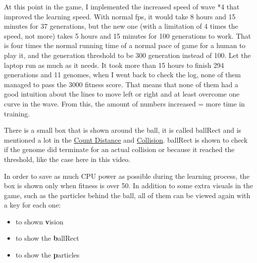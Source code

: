 At this point in the game, I implemented the increased speed of wave *4 that improved the learning speed. With normal fps, it would take 8 hours and 15 minutes for 37 generations, but the new one (with a limitation of 4 times the speed, not more) takes 5 hours and 15 minutes for 100 generations to work. That is four times the normal running time of a normal pace of game for a human to play it, and the generation threshold to be 300 generation instead of 100. Let the laptop run as much as it needs. It took more than 15 hours to finish 294 generations and 11 genomes, when I went back to check the log, none of them managed to pass the 3000 fitness score. That means that none of them had a good intuition about the lines to move left or right and at least overcome one curve in the wave. From this, the amount of numbers increased = more time in training.

There is a small box that is shown around the ball, it is called ballRect and is mentioned a lot in the \hyperref[sec:count-distance]{Count Distance} and \hyperref[sec:collision]{Collision}. ballRect is shown to check if the genome did terminate for an actual collision or because it reached the threshold, like the case here in this video.

In order to save as much CPU power as possible during the learning process, the box is shown only when fitness is over 50. In addition to some extra visuals in the game, such as the particles behind the ball, all of them can be viewed again with a key for each one:
\begin{itemize}
	\item {} to shown \textbf{v}ision
	\item {} to show the \textbf{b}allRect
	\item {} to show the \textbf{p}articles
\end{itemize}